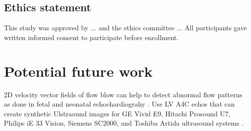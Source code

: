 \subsection{Ethics statement}
This study was approved by ... and the ethics committee ...
All participants gave written informed consent to participate before enrollment.

\section{Potential future work}
2D velocity vector fields of flow blow can help to detect abnormal flow patterns as done in fetal and neonatal echochardiograhy \cite{Meyers2020}.
Use LV A4C echos that can create synthetic Ulstraound images for GE Vivid E9, Hitachi Prosound U7, Philips iE 33 Vision, Siemens SC2000, and Toshiba Artida ultrasound systems \cite{brindise2020unsupervised}. 

